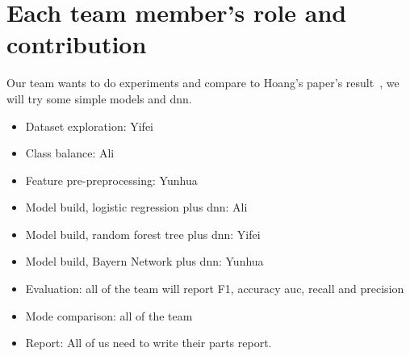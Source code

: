 \documentclass{article}
\begin{document}
\section{Each team member’s role and contribution}
Our team wants to do experiments and compare to Hoang's paper's result~\cite{hoang2019deepjit}, we will try some simple models and dnn.\\
\begin{itemize}
	\item Dataset exploration: Yifei 
	\item Class balance: Ali
	\item Feature pre-preprocessing: Yunhua
	\item Model build, logistic regression plus dnn: Ali
	\item Model build, random forest tree plus dnn: Yifei
	\item Model build, Bayern Network plus dnn: Yunhua
	\item Evaluation: all of the team will report F1, accuracy auc, recall and precision
	\item Mode comparison: all of the team
	\item Report: All of us need to write their parts report.
\end{itemize}
\end{document}
